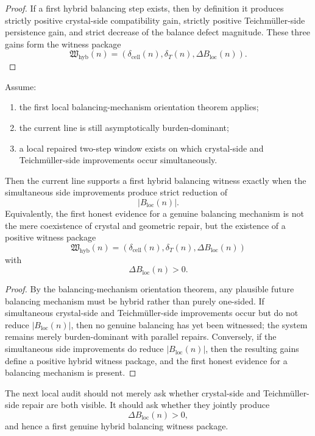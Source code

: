 \begin{proof}
If a first hybrid balancing step exists, then by definition it produces strictly positive crystal-side compatibility gain, strictly positive Teichm\"uller-side persistence gain, and strict decrease of the balance defect magnitude.
These three gains form the witness package
\[
 \mathfrak W_{\mathrm{hyb}}(n)
 =
 (\delta_{\mathrm{cell}}(n),\delta_{T}(n),\Delta B_{\mathrm{loc}}(n)).
\]
\end{proof}

\begin{theorem}
\label{thm:first-hybrid-balancing-witness-theorem}
Assume:
\begin{enumerate}[leftmargin=2em,label=(\alph*)]
 \item the first local balancing-mechanism orientation theorem applies;
 \item the current line is still asymptotically burden-dominant;
 \item a local repaired two-step window exists on which crystal-side and Teichm\"uller-side improvements occur simultaneously.
\end{enumerate}
Then the current line supports a first hybrid balancing witness exactly when the simultaneous side improvements produce strict reduction of
\[
 |B_{\mathrm{loc}}(n)|.
\]
Equivalently, the first honest evidence for a genuine balancing mechanism is not the mere coexistence of crystal and geometric repair, but the existence of a positive witness package
\[
 \mathfrak W_{\mathrm{hyb}}(n)
 =
 (\delta_{\mathrm{cell}}(n),\delta_{T}(n),\Delta B_{\mathrm{loc}}(n))
\]
with
\[
 \Delta B_{\mathrm{loc}}(n)>0.
\]
\end{theorem}

\begin{proof}
By the balancing-mechanism orientation theorem, any plausible future balancing mechanism must be hybrid rather than purely one-sided.
If simultaneous crystal-side and Teichm\"uller-side improvements occur but do not reduce \(|B_{\mathrm{loc}}(n)|\), then no genuine balancing has yet been witnessed; the system remains merely burden-dominant with parallel repairs.
Conversely, if the simultaneous side improvements do reduce \(|B_{\mathrm{loc}}(n)|\), then the resulting gains define a positive hybrid witness package, and the first honest evidence for a balancing mechanism is present.
\end{proof}

\begin{corollary}
\label{cor:current-hybrid-balancing-working-rule}
The next local audit should not merely ask whether crystal-side and Teichm\"uller-side repair are both visible.
It should ask whether they jointly produce
\[
 \Delta B_{\mathrm{loc}}(n)>0,
\]
and hence a first genuine hybrid balancing witness package.
\end{corollary}


